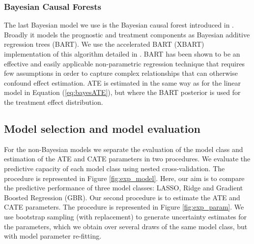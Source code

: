 \documentclass[12pt, a4paper]{article}
\begin{document}
\subsubsection*{Bayesian Causal Forests}
The last Bayesian model we use is the Bayesian causal forest introduced in
\citet{hahn2020}. Broadly it models the prognostic and treatment components as
Bayesian additive regression trees (BART). We use the accelerated BART (XBART) implementation of this algorithm detailed 
in \citet{krantsevich2022}. BART \citep{chipman2010} has been shown to be an 
effective and easily applicable non-parametric regression technique that 
requires few assumptions in order to capture complex relationships that can 
otherwise confound effect estimation. 
ATE is estimated in the same way as for the linear model in Equation 
(\ref{eq:bayesATE}), but where the BART posterior is used for the 
treatment effect distribution.




\subsection{Model selection and model evaluation}

For the non-Bayesian models we separate the evaluation of the model class and
estimation of the ATE and CATE parameters in two procedures. We evaluate the
predictive capacity of each model class using nested cross-validation. The
procedure is represented in Figure \ref{fig:exp_model}. Here, our aim is to
compare the predictive performance of three model classes: LASSO, Ridge and
Gradient Boosted Regression (GBR). Our second procedure is to estimate the ATE
and CATE parameters. The procedure is represented in Figure
\ref{fig:exp_param}. We use bootstrap sampling (with replacement) to generate
uncertainty estimates for the parameters, which we obtain over several draws of
the same model class, but with model parameter re-fitting.
\end{document}
